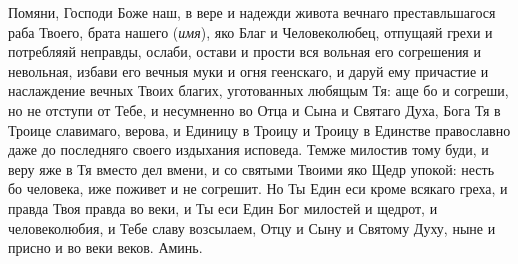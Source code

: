 \mychapterending


\begin{mymulticols}
 


Помяни, Господи Боже наш, в вере и надежди живота вечнаго преставльшагося раба Твоего, брата нашего ({\itshape имя}), яко Благ и Человеколюбец, отпущаяй грехи и потребляяй неправды, ослаби, остави и прости вся вольная его согрешения и невольная, избави его вечныя муки и огня геенскаго, и даруй ему причастие и наслаждение вечных Твоих благих, уготованных любящым Тя: аще бо и согреши, но не отступи от Тебе, и несумненно во Отца и Сына и Святаго Духа, Бога Тя в Троице славимаго, верова, и Единицу в Троицу и Троицу в Единстве православно даже до последняго своего издыхания исповеда. Темже милостив тому буди, и веру яже в Тя вместо дел вмени, и со святыми Твоими яко Щедр упокой: несть бо человека, иже поживет и не согрешит. Но Ты Един еси кроме всякаго греха, и правда Твоя правда во веки, и Ты еси Един Бог милостей и щедрот, и человеколюбия, и Тебе славу возсылаем, Отцу и Сыну и Святому Духу, ныне и присно и во веки веков. Аминь. 

\end{mymulticols}

\mychapterending



